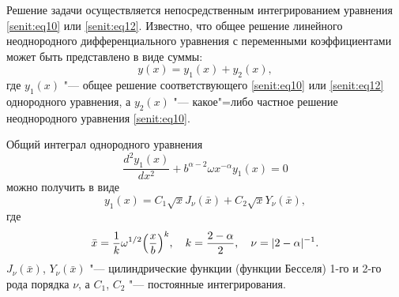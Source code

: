 \smallskip

 Решение задачи осуществляется непосредственным интегрированием уравнения \eqref{senit:eq10} или \eqref{senit:eq12}.
Известно, что общее решение линейного неоднородного дифференциального уравнения с переменными коэффициентами может быть представлено в виде суммы:
\begin{equation}
\label{senit:eq2.1}
y(x)=y_1 (x)+y_2 (x),
\end{equation}
где $y_1(x)$ "--- общее решение соответствующего \eqref{senit:eq10} или \eqref{senit:eq12} однородного уравнения, а $y_2 (x)$ "--- какое"=либо частное решение неоднородного уравнения \eqref{senit:eq10}. 

Общий интеграл однородного уравнения
\begin{equation}
\label{senit:eq2.2}
\frac{d^2 y_1 (x)}{dx^2}+b^{\alpha -2}\omega x^{-\alpha }y_1 (x)=0
\end{equation}
можно получить в виде 
\begin{equation}
\label{senit:eq2.9}
y_1(x)=C_1 \sqrt x J_\nu (\bar{x})+C_2 \sqrt x Y_\nu (\bar{x} ),
\end{equation}
где 
\begin{gather}
\label{senit:eq2.3}
\bar x =\frac{1}{k}\omega ^{{1}/{2}}\Bigl(\frac{x}{b} \Bigr)^k, \quad k=\frac{2-\alpha }{2}, \quad 
\nu =|2-\alpha |^{-1}.
\end{gather}
$J_\nu (\bar{x})$, $Y_\nu (\bar{x})$ "--- цилиндрические функции (функции Бесселя) 1-го и 2-го рода порядка $\nu$, а $C_1$, $C_2$ "--- постоянные интегрирования.


